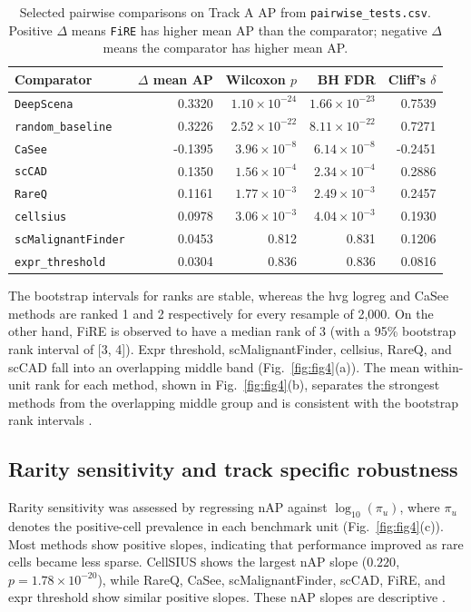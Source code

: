 \documentclass[10pt]{article}
\begin{document}
\begin{table}[H]
\centering
\caption{Selected pairwise comparisons on Track A AP from
\texttt{pairwise\_tests.csv}. Positive $\Delta$ means \texttt{FiRE} has
higher mean AP than the comparator; negative $\Delta$ means the
comparator has higher mean AP.}
\label{tab:pairwise}
\small
\begin{tabular}{lrrrr}
\toprule
Comparator & $\Delta$ mean AP & Wilcoxon $p$ & BH FDR & Cliff's $\delta$ \\
\midrule
\texttt{DeepScena}        &  0.3320 & $1.10\!\times\!10^{-24}$ & $1.66\!\times\!10^{-23}$ &  0.7539 \\
\texttt{random\_baseline} &  0.3226 & $2.52\!\times\!10^{-22}$ & $8.11\!\times\!10^{-22}$ &  0.7271 \\
\texttt{CaSee}            & -0.1395 & $3.96\!\times\!10^{-8}$  & $6.14\!\times\!10^{-8}$  & -0.2451 \\
\texttt{scCAD}            &  0.1350 & $1.56\!\times\!10^{-4}$  & $2.34\!\times\!10^{-4}$  &  0.2886 \\
\texttt{RareQ}            &  0.1161 & $1.77\!\times\!10^{-3}$  & $2.49\!\times\!10^{-3}$  &  0.2457 \\
\texttt{cellsius}         &  0.0978 & $3.06\!\times\!10^{-3}$  & $4.04\!\times\!10^{-3}$  &  0.1930 \\
\texttt{scMalignantFinder}&  0.0453 & 0.812                    & 0.831                    &  0.1206 \\
\texttt{expr\_threshold}  &  0.0304 & 0.836                    & 0.836                    &  0.0816 \\
\bottomrule
\end{tabular}
\end{table}

The bootstrap intervals for ranks are stable, whereas the hvg logreg and CaSee methods are ranked 1 and 2 respectively for every resample of 2,000. On the other hand, FiRE is observed to have a median rank of 3 (with a 95\% bootstrap rank interval of [3, 4]). Expr threshold, scMalignantFinder, cellsius, RareQ, and scCAD fall into an overlapping middle band (Fig.~\ref{fig:fig4}(a)). The mean within-unit rank for each method, shown in Fig.~\ref{fig:fig4}(b), separates the strongest methods from the overlapping middle group and is consistent with the bootstrap rank intervals \cite{gorodkin2004comparing}.

\subsection{Rarity sensitivity and track specific robustness}
Rarity sensitivity was assessed by regressing nAP against $\log_{10}(\pi_u)$, where $\pi_u$ denotes the positive-cell prevalence in each benchmark unit (Fig.~\ref{fig:fig4}(c)). Most methods show positive slopes, indicating that performance improved as rare cells became less sparse. CellSIUS shows the largest nAP slope ($0.220$, $p = 1.78 \times 10^{-20}$), while RareQ, CaSee, scMalignantFinder, scCAD, FiRE, and expr threshold show similar positive slopes. These nAP slopes are descriptive \cite{johnson2019survey,altalhan2025imbalanced}.
\end{document}
